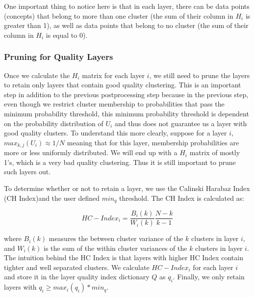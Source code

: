 One important thing to notice here is that in each layer, there can be data points (concepts) that belong to more than one cluster (the sum of their column in $H_{i}$ is greater than 1), as well as data points that belong to no cluster (the sum of their column in $H_{i}$ is equal to 0).

\subsubsection{Pruning for Quality Layers}\label{pruning_layers}
Once we calculate the $H_{i}$ matrix for each layer $i$, we still need to prune the layers to retain only layers that contain good quality clustering. This is an important step in addition to the previous postprocessing step because in the previous step, even though we restrict cluster membership to probabilities that pass the minimum probability threshold, this minimum probability threshold is dependent on the probability distribution of $U_{i}$ and thus does not guarantee us a layer with good quality clusters. To understand this more clearly, suppose for a layer $i$, $max_{k,j}(U_{i}) \approx 1/N$ meaning that for this layer, membership probabilities are more or less uniformly distributed. We will end up with a $H_{i}$ matrix of mostly 1's, which is a very bad quality clustering. Thus it is still important to prune such layers out.

To determine whether or not to retain a layer, we use the Calinski Harabaz Index (CH Index)and the user defined $min_q$ threshold. The CH Index is calculated as:

\begin{equation}
HC-Index_{i} = \frac{B_{i}(k)}{W_{i}(k)}\frac{N-k}{k-1}
\end{equation}

where $B_{i}(k)$ measures the between cluster variance of the $k$ clusters in layer $i$, and $W_{i}(k)$ is the sum of the within cluster variances of the $k$ clusters in layer $i$. The intuition behind the HC Index is that layers with higher HC Index contain tighter and well separated clusters.
We calculate $HC-Index_{i}$ for each layer $i$ and store it in the layer quality index dictionary $Q$ as $q_{i}$. Finally, we only retain layers with $q_{i} \geq max_{i}(q_{i}) * min_q$.

